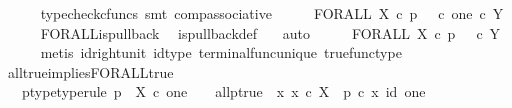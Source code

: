 \begin{isabellebody}
\ \ \ \ \isamarkupfalse%
\ {\isacharparenleft}{\kern0pt}typecheck{\isacharunderscore}{\kern0pt}cfuncs{\isacharcomma}{\kern0pt}\ smt\ comp{\isacharunderscore}{\kern0pt}associative{}{\isacharparenright}{\kern0pt}\isanewline
\ \ \isamarkupfalse%
\ \isamarkupfalse%
\ {\isachardoublequoteopen}FORALL\ X\ {\isasymcirc}\isactrlsub c\ p\isactrlsup {\isasymsharp}\ {\isacharequal}{\kern0pt}\ {\isacharparenleft}{\kern0pt}{\isasymt}\ {\isasymcirc}\isactrlsub c\ {\isasymbeta}\isactrlbsub one\isactrlesub {\isacharparenright}{\kern0pt}\ {\isasymcirc}\isactrlsub c\ {\isasymbeta}\isactrlbsub Y\isactrlesub {\isachardoublequoteclose}\isanewline
\ \ \ \ \isamarkupfalse%
\ FORALL{\isacharunderscore}{\kern0pt}is{\isacharunderscore}{\kern0pt}pullback\ \isamarkupfalse%
\ is{\isacharunderscore}{\kern0pt}pullback{\isacharunderscore}{\kern0pt}def\ \ \isamarkupfalse%
\ auto\isanewline
\ \ \isamarkupfalse%
\ \isamarkupfalse%
\ {\isachardoublequoteopen}FORALL\ X\ {\isasymcirc}\isactrlsub c\ p\isactrlsup {\isasymsharp}\ {\isacharequal}{\kern0pt}\ {\isasymt}\ {\isasymcirc}\isactrlsub c\ {\isasymbeta}\isactrlbsub Y\isactrlesub {\isachardoublequoteclose}\isanewline
\ \ \ \ \isamarkupfalse%
\ {\isacharparenleft}{\kern0pt}metis\ id{\isacharunderscore}{\kern0pt}right{\isacharunderscore}{\kern0pt}unit{}\ id{\isacharunderscore}{\kern0pt}type\ terminal{\isacharunderscore}{\kern0pt}func{\isacharunderscore}{\kern0pt}unique\ true{\isacharunderscore}{\kern0pt}func{\isacharunderscore}{\kern0pt}type{\isacharparenright}{\kern0pt}\isanewline
{}\isamarkupfalse%
%
\endisatagproof
{\isafoldproof}%
%
\isadelimproof
\isanewline
%
\endisadelimproof
\isanewline
{}\isamarkupfalse%
\ all{\isacharunderscore}{\kern0pt}true{\isacharunderscore}{\kern0pt}implies{\isacharunderscore}{\kern0pt}FORALL{\isacharunderscore}{\kern0pt}true{}{\isacharcolon}{\kern0pt}\isanewline
\ \ \ p{\isacharunderscore}{\kern0pt}type{\isacharbrackleft}{\kern0pt}type{\isacharunderscore}{\kern0pt}rule{\isacharbrackright}{\kern0pt}{\isacharcolon}{\kern0pt}\ {\isachardoublequoteopen}p\ {\isacharcolon}{\kern0pt}\ X\ {\isasymtimes}\isactrlsub c\ one\ {\isasymrightarrow}\ {\isasymOmega}{\isachardoublequoteclose}\ \ all{\isacharunderscore}{\kern0pt}p{\isacharunderscore}{\kern0pt}true{\isacharcolon}{\kern0pt}\ {\isachardoublequoteopen}{\isasymAnd}\ x{\isachardot}{\kern0pt}\ x\ {\isasymin}\isactrlsub c\ X\ {\isasymLongrightarrow}\ p\ {\isasymcirc}\isactrlsub c\ {\isasymlangle}x{\isacharcomma}{\kern0pt}\ id\ one{\isasymrangle}\ {\isacharequal}{\kern0pt}\ {\isasymt}{\isachardoublequoteclose}\isanewline

\end{isabellebody}

